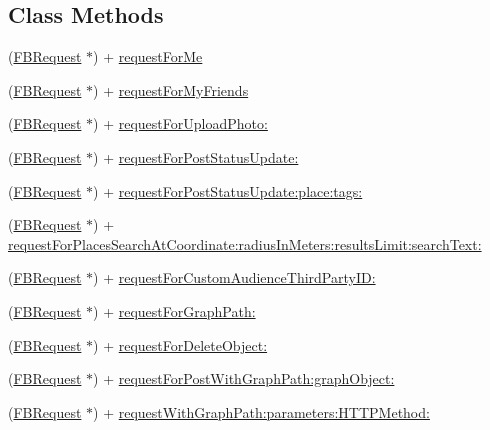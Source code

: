 \subsection*{Class Methods}
\begin{DoxyCompactItemize}
\item 
(\hyperlink{interfaceFBRequest}{F\+B\+Request} $\ast$) + \hyperlink{interfaceFBRequest_a1a8fb083c2d09cbbc5ae9afd33e2381f}{request\+For\+Me}
\item 
(\hyperlink{interfaceFBRequest}{F\+B\+Request} $\ast$) + \hyperlink{interfaceFBRequest_a95570ea8628f71b3c311da8378729cc6}{request\+For\+My\+Friends}
\item 
(\hyperlink{interfaceFBRequest}{F\+B\+Request} $\ast$) + \hyperlink{interfaceFBRequest_a871fdb57a3c9907a5d2b788ca442c586}{request\+For\+Upload\+Photo\+:}
\item 
(\hyperlink{interfaceFBRequest}{F\+B\+Request} $\ast$) + \hyperlink{interfaceFBRequest_a0a745a53f4764835bd0945bd66fe10fd}{request\+For\+Post\+Status\+Update\+:}
\item 
(\hyperlink{interfaceFBRequest}{F\+B\+Request} $\ast$) + \hyperlink{interfaceFBRequest_a5560f9786dcf54ca907153c611f991ed}{request\+For\+Post\+Status\+Update\+:place\+:tags\+:}
\item 
(\hyperlink{interfaceFBRequest}{F\+B\+Request} $\ast$) + \hyperlink{interfaceFBRequest_a1965c2185e0d9c98e19d0edd20180ab8}{request\+For\+Places\+Search\+At\+Coordinate\+:radius\+In\+Meters\+:results\+Limit\+:search\+Text\+:}
\item 
(\hyperlink{interfaceFBRequest}{F\+B\+Request} $\ast$) + \hyperlink{interfaceFBRequest_a17f11f5dad042b4109b3a001300d6916}{request\+For\+Custom\+Audience\+Third\+Party\+I\+D\+:}
\item 
(\hyperlink{interfaceFBRequest}{F\+B\+Request} $\ast$) + \hyperlink{interfaceFBRequest_a33356f35896b2f50d96ed24c8ddf5841}{request\+For\+Graph\+Path\+:}
\item 
(\hyperlink{interfaceFBRequest}{F\+B\+Request} $\ast$) + \hyperlink{interfaceFBRequest_a6d457b796765de6b436e5ff6cf11cc44}{request\+For\+Delete\+Object\+:}
\item 
(\hyperlink{interfaceFBRequest}{F\+B\+Request} $\ast$) + \hyperlink{interfaceFBRequest_ac3f506dd49d0757265f44b41c9579c8b}{request\+For\+Post\+With\+Graph\+Path\+:graph\+Object\+:}
\item 
(\hyperlink{interfaceFBRequest}{F\+B\+Request} $\ast$) + \hyperlink{interfaceFBRequest_a2e3ee15f72f7e3380495fcf1660154ce}{request\+With\+Graph\+Path\+:parameters\+:\+H\+T\+T\+P\+Method\+:}

\end{DoxyCompactItemize}
